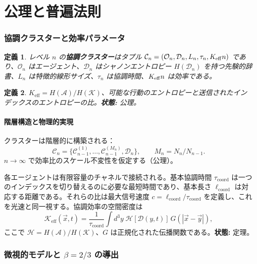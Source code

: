 \documentclass[11pt,a4paper]{article}
\newtheorem{definition}{定義}[section]
\newcommand{\Keff}[1][]{K_{\mathrm{eff}\if\relax\detokenize{#1}\relax\else,#1\fi}}
\newcommand{\coord}{\mathrm{coord}}
\newcommand{\Dir}{\mathcal{D}}
\newcommand{\cC}{\mathcal{C}}
\begin{document}
	\tableofcontents
	\newpage
	
	\part{公理と普遍法則}
	
	\section{協調クラスターと効率パラメータ}
	\begin{definition}
		レベル \(n\) の\textbf{協調クラスター}はタプル \(\cC_n = (\mathcal{O}_n, \Dir_n, L_n, \tau_n, \Keff{n})\) であり、\(\mathcal{O}_n\) はエージェント、\(\Dir_n\) はシャノンエントロピー \(H(\Dir_n)\) を持つ先験的辞書、\(L_n\) は特徴的線形サイズ、\(\tau_n\) は協調時間、\(\Keff{n}\) は効率である。
	\end{definition}
	
	\begin{definition}
		\(K_{\mathrm{eff}} = H(\mathcal{A})/H(\mathcal{K})\)、可能な行動のエントロピーと送信されたインデックスのエントロピーの比。\textbf{状態:} 公理。
	\end{definition}
	
	\subsection{階層構造と物理的実現}
	クラスターは階層的に構築される：
	\[
	\cC_n = \{\cC_{n-1}^{(1)},\dots,\cC_{n-1}^{(M_n)},\Dir_n\}, \qquad M_n = N_n/N_{n-1}.
	\]
	\(n\to\infty\) で効率比のスケール不変性を仮定する（公理）。
	
	各エージェントは有限容量のチャネルで接続される。基本協調時間 \(\tau_{\coord}\) は一つのインデックスを切り替えるのに必要な最短時間であり、基本長さ \(\ell_{\coord}\) は対応する距離である。それらの比は最大信号速度 \(c = \ell_{\coord}/\tau_{\coord}\) を定義し、これを光速と同一視する。協調効率の空間密度は
	\begin{equation}
		\mathcal{K}_{\mathrm{eff}}(\vec{x},t) = \frac{1}{\tau_{\coord}} \int d^3y\; \mathcal{H}[\Dir(y,t)]\, G(|\vec{x}-\vec{y}|),
		\label{eq:Kfield}
	\end{equation}
	ここで \(\mathcal{H} = H(\mathcal{A})/H(\mathcal{K})\)、\(G\) は正規化された伝播関数である。\textbf{状態:} 定理。
	
	\section{微視的モデルと \(\beta = 2/3\) の導出}
	\label{sec:micro}
	
\end{document}
